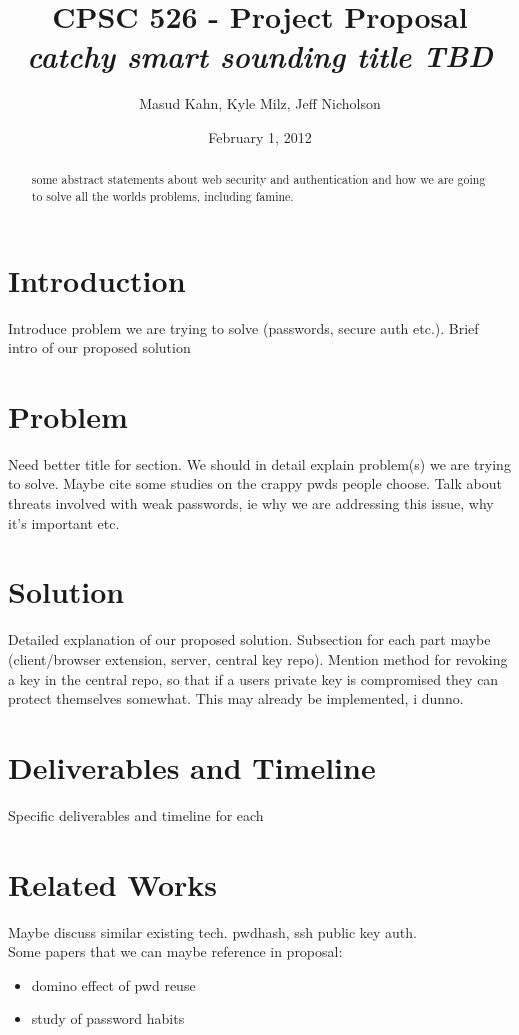 \documentclass[11pt]{article}   %
\begin{document}
\title{\bf CPSC 526 - Project Proposal \\ \emph{catchy smart sounding title TBD}}   %
\author{Masud Kahn, Kyle Milz, Jeff Nicholson}         %
\date{February 1, 2012}    %
\maketitle

\tableofcontents
\pagebreak
\begin{abstract}
some abstract statements about web security and authentication and how we are going to solve all the worlds problems, including famine.
\end{abstract}
\pagebreak
\section{Introduction}
Introduce problem we are trying to solve (passwords, secure auth etc.). Brief intro of our proposed solution

\section{Problem}
Need better title for section. We should in detail explain problem(s) we are trying to solve. Maybe cite some studies on the crappy pwds people choose. Talk about threats involved with weak passwords, ie why we are addressing this issue, why it's important etc.

\section{Solution}
Detailed explanation of our proposed solution. Subsection for each part maybe (client/browser extension, server, central key repo).
Mention method for revoking a key in the central repo, so that if a users private key is compromised they can protect themselves somewhat. This may already be implemented, i dunno.

\section{Deliverables and Timeline}
Specific deliverables and timeline for each

\section{Related Works}
Maybe discuss similar existing tech. pwdhash, ssh public key auth.\\
Some papers that we can maybe reference in proposal:
\begin{itemize}
\item domino effect of pwd reuse \cite{domino}
\item study of password habits \cite{habits}
\end{itemize}


{}
\end{document}
